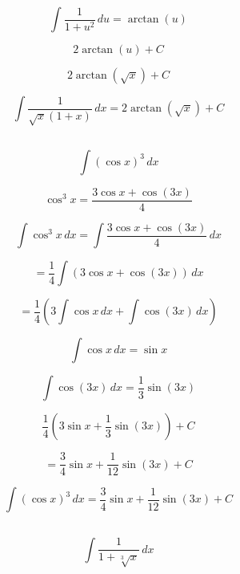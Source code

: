 \documentclass[12pt]{article}
\begin{document}
	
	\[
	\int \frac{1}{1+u^2} \, du = \arctan(u)
	\]
	

	
	\[
	2 \arctan(u) + C
	\]
	

	
	\[
	2 \arctan(\sqrt{x}) + C
	\]
	

	
	\[
	\int \frac{1}{\sqrt{x}(1+x)} \, dx = 2 \arctan(\sqrt{x}) + C
	\]
	

\subsection{}









	

	
	\[
	\int (\cos x)^3 \, dx
	\]
	

	
	\[
	\cos^3 x = \frac{3\cos x + \cos(3x)}{4}
	\]
	
	
	\[
	\int \cos^3 x \, dx = \int \frac{3 \cos x + \cos(3x)}{4} \, dx
	\]
	

	
	\[
	= \frac{1}{4} \int (3 \cos x + \cos(3x)) \, dx
	\]
	

	
	\[
	= \frac{1}{4} \left( 3 \int \cos x \, dx + \int \cos(3x) \, dx \right)
	\]
	

	
	\[
	\int \cos x \, dx = \sin x
	\]

	\[
	\int \cos(3x) \, dx = \frac{1}{3} \sin(3x)
	\]
	

	
	\[
	\frac{1}{4} \left( 3 \sin x + \frac{1}{3} \sin(3x) \right) + C
	\]
	
	\[
	= \frac{3}{4} \sin x + \frac{1}{12} \sin(3x) + C
	\]
	

	
	\[
	\int (\cos x)^3 \, dx = \frac{3}{4} \sin x + \frac{1}{12} \sin(3x) + C
	\]


\subsection{}	






	
	\[
	\int \frac{1}{1 + \sqrt[3]{x}} \, dx
	\]
	
\end{document}

